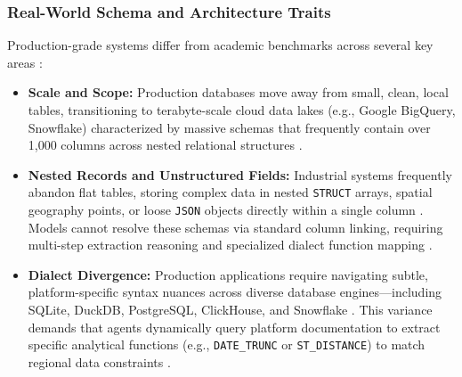 \subsubsection{Real-World Schema and Architecture Traits}
Production-grade systems differ from academic benchmarks across several key areas \cite{TEXT_TO_SQL_WORKFLOWS}:
\begin{itemize}
   \item \textbf{Scale and Scope:} Production databases move away from small, clean, local tables, transitioning to terabyte-scale cloud data lakes (e.g., Google BigQuery, Snowflake) characterized by massive schemas that frequently contain over 1,000 columns across nested relational structures \cite{TEXT_TO_SQL_WORKFLOWS}.
   \item \textbf{Nested Records and Unstructured Fields:} Industrial systems frequently abandon flat tables, storing complex data in nested \texttt{STRUCT} arrays, spatial geography points, or loose \texttt{JSON} objects directly within a single column \cite{TEXT_TO_SQL_WORKFLOWS}. Models cannot resolve these schemas via standard column linking, requiring multi-step extraction reasoning and specialized dialect function mapping \cite{TEXT_TO_SQL_WORKFLOWS}.
   \item \textbf{Dialect Divergence:} Production applications require navigating subtle, platform-specific syntax nuances across diverse database engines---including SQLite, DuckDB, PostgreSQL, ClickHouse, and Snowflake \cite{TEXT_TO_SQL_WORKFLOWS}. This variance demands that agents dynamically query platform documentation to extract specific analytical functions (e.g., \texttt{DATE\_TRUNC} or \texttt{ST\_DISTANCE}) to match regional data constraints \cite{TEXT_TO_SQL_WORKFLOWS}.
\end{itemize}